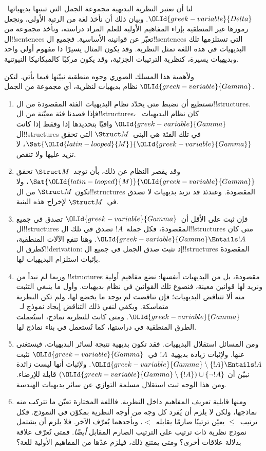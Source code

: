 \documentclass[../../../include/open-logic-section]{subfiles}
\begin{document}
\begin{explain}
لنا أن نعتبر النظرية البديهية مجموعة الجمل التي تبنيها
بديهياتها~${\OLId{greek-variable}{Delta}}$. وبيان ذلك أن نأخذ لغة من الرتبة الأولى،
ونجعل رموزها غير المنطقية بإزاء المفاهيم الأولية للعلم المراد
دراسته، ونأخذ مجموعة من ال!!{sentence}s تعبّر عن قوانينه الأساسية.
فجميع ال!!{sentence}s التي تستلزمها تلك البديهيات في هذه اللغة
تمثل النظرية. وقد يكون المثال يسيرًا ذا مفهوم أولي واحد وبديهيات
يسيرة، كنظرية الترتيبات الجزئية، وقد يكون مركبًا كالميكانيكا
النيوتنية.

ولأهمية هذا المسلك الصوري وجوه منطقية نبيّنها فيما يأتي.
لتكن ${\OLId{greek-variable}{Gamma}}$ نظام بديهيات لنظرية، أي مجموعة من الجمل.
\begin{enumerate}
\item نستطيع أن نضبط متى يحدّد نظام البديهيات الفئة المقصودة من
  ال!!{structure}s. فإذا قصدنا فئة معيّنة من ال!!{structure}s،
  كان نظام البديهيات~${\OLId{greek-variable}{Gamma}}$ وافيًا بتحديدها إذا وفقط إذا كانت
  ال!!{structure}s في تلك الفئة هي البنى~$\Struct M$ التي تحقق
  $\Sat{{\OLId{latin-looped}{M}}}{{\OLId{greek-variable}{Gamma}}}$، لا تزيد عليها ولا تنقص.
\item وقد يقصر النظام عن ذلك، بأن توجد~$\Struct M$ تحقق
  $\Sat{{\OLId{latin-looped}{M}}}{{\OLId{greek-variable}{Gamma}}}$، ولا تكون $\Struct M$ من ال!!{structure}s
  المقصودة. وعندئذ قد نزيد بديهيات لا تصدق
  في~$\Struct M$ لإخراج هذه البنية.
\item فإن ثبت على الأقل أن~${\OLId{greek-variable}{Gamma}}$ تصدق في جميع
  ال!!{structure}s المقصودة، فكل جملة~$!A$ تصدق في تلك
  ال!!{structure}s متى كان ${\OLId{greek-variable}{Gamma}} \Entails !A$. وهنا تنفع
  الآلات المنطقية، كطرق ال!!{derivation}: إذ نثبت صدق الجمل
  في جميع ال!!{structure}s المقصودة بإثبات استلزام البديهيات لها.
\item وربما لم نبدأ من !!{structure}s مقصودة، بل من البديهيات
  أنفسها: نضع مفاهيم أولية ونريد لها قوانين معينة، فنصوغ تلك
  القوانين في نظام بديهيات. وأول ما ينبغي التثبت منه ألا تتناقض
  البديهيات؛ فإن تناقضت لم يوجد ما يخضع لها، ولم تكن النظرية
  متماسكة. ويكفي لنفي ذلك التناقض إيجاد نموذج
  لـ~${\OLId{greek-variable}{Gamma}}$. ومتى كانت للنظرية نماذج، استُعملت الطرق المنطقية
  في دراستها، كما تُستعمل في بناء نماذج لها.
\item ومن المسائل استقلال البديهيات. فقد تكون بديهية نتيجة
  لسائر البديهيات، فيستغنى عنها. ولإثبات زيادة بديهية~$!A$
  في~${\OLId{greek-variable}{Gamma}}$ نثبت
  ${\OLId{greek-variable}{Gamma}} \setminus \{!A\} \Entails !A$. ولإثبات أنها ليست زائدة
  نبيّن أن
  $({\OLId{greek-variable}{Gamma}} \setminus \{!A\}) \cup \{\lnot !A\}$ قابلة للإرضاء.
  ومن هذا الوجه ثبت استقلال مسلمة التوازي عن سائر بديهيات
  الهندسة.
\item ومنها قابلية تعريف المفاهيم داخل النظرية. فاللغة المختارة
  تعيّن ما تتركب منه نماذجها، ولكن لا يلزم أن يُفرد كل وجه من
  أوجه النظرية بمكوّن في النموذج. فكل ترتيب~$\le$ يعيّن ترتيبًا
  صارمًا يقابله~$<$، وبأحدهما يُعرّف الآخر. فلا يلزم أن يشتمل
  نموذج نظرية ذات ترتيب على الترتيب الصارم المقابل
  \emph{أيضًا}. فمتى تُعرّف علاقة بدلالة علاقات أخرى؟ ومتى يمتنع
  ذلك، فيلزم عدّها من المفاهيم الأولية للغة؟
\end{enumerate}
\end{explain}
\end{document}
